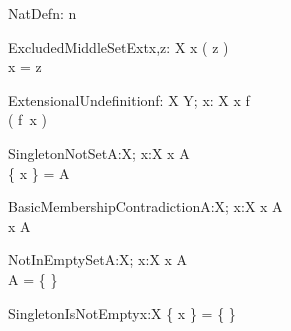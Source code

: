 \begin{theorem}{NatDef}{n: \nat}
 \leq n
\end{theorem}


\begin{theorem}{ExcludedMiddleSetExt}{x,\const z: X}
x \notin \se( z ) \\
x = z \\
\end{theorem}

\begin{theorem}{ExtensionalUndefinition}{f: X \pfun Y; x: X}
x \notin \dom f \\
\sw( f~x ) \\
\end{theorem}






\begin{theorem}{SingletonNotSet}{A:\power X; x:X}
x \notin A \\
\{ x \} = A
\end{theorem}

\begin{theorem}{BasicMembershipContradiction}{A:\power X; x:X}
x \in A \\
x \notin A
\end{theorem}

\begin{theorem}{NotInEmptySet}{A:\power X; x:X}
x \in A \\
A = \{ \}
\end{theorem}

\begin{theorem}{SingletonIsNotEmpty}{x:X}
\{ x \} = \{ \}
\end{theorem}

